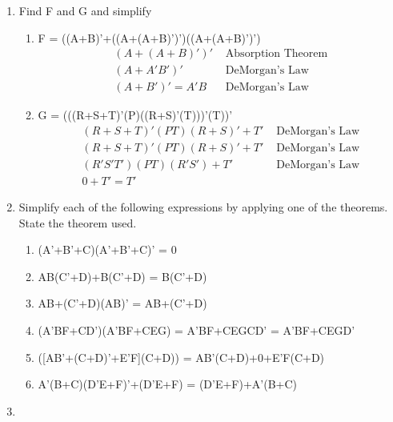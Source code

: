 \documentclass[12pt]{article}
\begin{document}
\begin{enumerate}
\begin{enumerate}
        \end{enumerate}
    \addtocounter{enumi}{1}\item Find F and G and simplify
    \begin{enumerate}
        \item F = ((A+B)'+((A+(A+B)')')((A+(A+B)')')
        \begin{align*}
            (A+(A+B)')' &\text{ Absorption Theorem}\\
            (A+A'B')' &\text{ DeMorgan's Law}\\
            (A+B')' = A'B &\text{ DeMorgan's Law}
        \end{align*}
        \item G = (((R+S+T)'(P)((R+S)'(T)))'(T))'
        \begin{align*}
            (R+S+T)'(PT)(R+S)'+T' &\text{ DeMorgan's Law}\\
            (R+S+T)'(PT)(R+S)'+T' &\text{ DeMorgan's Law}\\            (R'S'T')(PT)(R'S')+T' &\text{ DeMorgan's Law}\\
            0+T' = T'
        \end{align*}
    \end{enumerate}
    \addtocounter{enumi}{1}\item Simplify each of the following expressions by applying one of the theorems. State the theorem used.
    \begin{enumerate}
        \item (A'+B'+C)(A'+B'+C)' = 0\\
        \item AB(C'+D)+B(C'+D) = B(C'+D)\\
        \item AB+(C'+D)(AB)' = AB+(C'+D)\\
        \item (A'BF+CD')(A'BF+CEG) = A'BF+CEGCD' = A'BF+CEGD'\\
        \item ([AB'+(C+D)'+E'F](C+D)) = AB'(C+D)+0+E'F(C+D)
        \\
        \item A'(B+C)(D'E+F)'+(D'E+F) = (D'E+F)+A'(B+C)
        \\
    \end{enumerate}
    \newpage\addtocounter{enumi}{1}\item

\end{enumerate}
\end{document}
